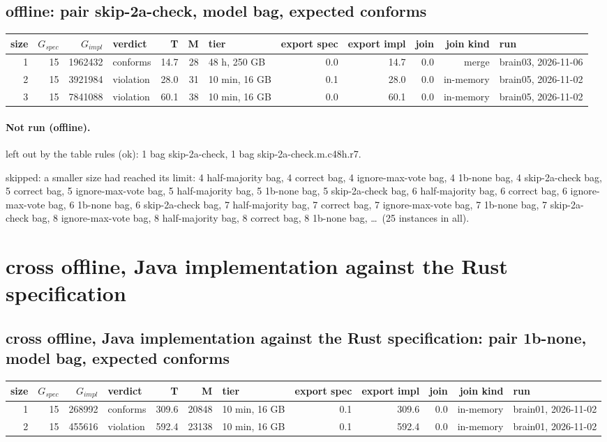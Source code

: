 \documentclass[10pt]{article}
\begin{document}
\subsection*{offline: pair \textsf{skip-2a-check}, model bag, expected conforms}
\begin{longtable}{@{}rrrlrrlrrrrl@{}}
\toprule
size & $G_{\mathit{spec}}$ & $G_{\mathit{impl}}$ & verdict & T & M & tier & export spec & export impl & join & join kind & run \\
\midrule
\endhead
\color{blue} 1 & 15 & 1962432 & conforms & 14.7 & 28 & 48 h, 250 GB & 0.0 & 14.7 & 0.0 & merge & brain03, 2026-11-06 \\
\color{red} 2 & 15 & 3921984 & violation & 28.0 & 31 & 10 min, 16 GB & 0.1 & 28.0 & 0.0 & in-memory & brain05, 2026-11-02 \\
\color{red} 3 & 15 & 7841088 & violation & 60.1 & 38 & 10 min, 16 GB & 0.0 & 60.1 & 0.0 & in-memory & brain05, 2026-11-02 \\
\bottomrule
\end{longtable}
\paragraph{Not run (offline).}
left out by the table rules (ok): 1 bag skip-2a-check, 1 bag skip-2a-check.m.c48h.r7.\par
skipped: a smaller size had reached its limit: 4 half-majority bag, 4 correct bag, 4 ignore-max-vote bag, 4 1b-none bag, 4 skip-2a-check bag, 5 correct bag, 5 ignore-max-vote bag, 5 half-majority bag, 5 1b-none bag, 5 skip-2a-check bag, 6 half-majority bag, 6 correct bag, 6 ignore-max-vote bag, 6 1b-none bag, 6 skip-2a-check bag, 7 half-majority bag, 7 correct bag, 7 ignore-max-vote bag, 7 1b-none bag, 7 skip-2a-check bag, 8 ignore-max-vote bag, 8 half-majority bag, 8 correct bag, 8 1b-none bag, \ldots\ (25 instances in all).\par
\section*{cross offline, Java implementation against the Rust specification}
\subsection*{cross offline, Java implementation against the Rust specification: pair \textsf{1b-none}, model bag, expected conforms}
\begin{longtable}{@{}rrrlrrlrrrrl@{}}
\toprule
size & $G_{\mathit{spec}}$ & $G_{\mathit{impl}}$ & verdict & T & M & tier & export spec & export impl & join & join kind & run \\
\midrule
\endhead
\color{red} 1 & 15 & 268992 & conforms & 309.6 & 20848 & 10 min, 16 GB & 0.1 & 309.6 & 0.0 & in-memory & brain01, 2026-11-02 \\
\color{red} 2 & 15 & 455616 & violation & 592.4 & 23138 & 10 min, 16 GB & 0.1 & 592.4 & 0.0 & in-memory & brain01, 2026-11-02 \\
\bottomrule
\end{longtable}
\end{document}
